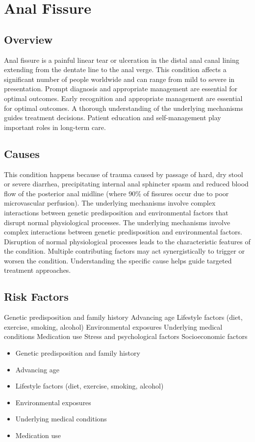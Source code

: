 \chapter{Anal Fissure}
\label{sec:Anal Fissure}

\section{Overview}
Anal fissure is a painful linear tear or ulceration in the distal anal canal lining extending from the dentate line to the anal verge. This condition affects a significant number of people worldwide and can range from mild to severe in presentation. Prompt diagnosis and appropriate management are essential for optimal outcomes. Early recognition and appropriate management are essential for optimal outcomes. A thorough understanding of the underlying mechanisms guides treatment decisions. Patient education and self-management play important roles in long-term care.
\section{Causes}
This condition happens because of trauma caused by passage of hard, dry stool or severe diarrhea, precipitating internal anal sphincter spasm and reduced blood flow of the posterior anal midline (where 90\% of fissures occur due to poor microvascular perfusion). The underlying mechanisms involve complex interactions between genetic predisposition and environmental factors that disrupt normal physiological processes. The underlying mechanisms involve complex interactions between genetic predisposition and environmental factors. Disruption of normal physiological processes leads to the characteristic features of the condition. Multiple contributing factors may act synergistically to trigger or worsen the condition. Understanding the specific cause helps guide targeted treatment approaches.
\section{Risk Factors}
Genetic predisposition and family history Advancing age Lifestyle factors (diet, exercise, smoking, alcohol) Environmental exposures Underlying medical conditions Medication use Stress and psychological factors Socioeconomic factors

\begin{itemize}[noitemsep]
  \item Genetic predisposition and family history
  \item Advancing age
  \item Lifestyle factors (diet, exercise, smoking, alcohol)
  \item Environmental exposures
  \item Underlying medical conditions
  \item Medication use
\end{itemize}
